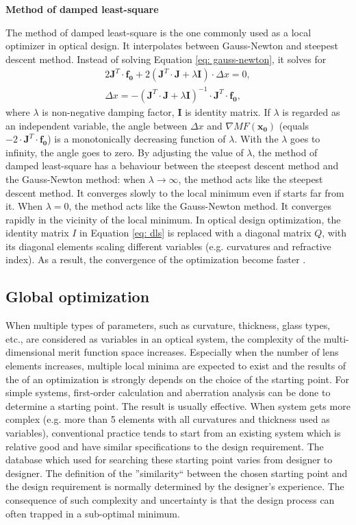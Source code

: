 \textbf{Method of damped least-square}

The method of damped least-square is the one commonly used as a local optimizer in optical design. It interpolates between Gauss-Newton and steepest descent method.  
Instead of solving Equation \ref{eq: gauss-newton}, it solves for 
\begin{equation} \label{eq: dls}
\begin{align}
2 \pmb{J}^{T} \cdot \pmb{f_0} + 2(\pmb{J}^T \cdot \pmb{J} + \lambda \pmb{I} )\cdot \Delta x = 0 , \\
\Delta x = - (\pmb{J}^T \cdot \pmb{J} + \lambda \pmb{I} )^{-1} \cdot \pmb{J}^{T} \cdot \pmb{f_0},
\end{align}
\end{equation}where $\lambda$ is non-negative damping factor, $\pmb{I}$ is identity matrix. If $\lambda$ is regarded as an independent variable, the angle between $\Delta x$ and $\nabla MF(\pmb{x_0}) $ (equals $-2 \cdot \pmb{J}^{T} \cdot \pmb{f_0}$) is a monotonically decreasing function of $\lambda$. With the $\lambda$ goes to infinity, the angle goes to zero. By adjusting the value of $\lambda$, the method of damped least-square has a behaviour between the steepest descent method and the Gauss-Newton method: when $\lambda \rightarrow \infty $, the method acts like the steepest descent method. It converges slowly to the local minimum even if starts far from it. When $\lambda = 0$, the method acts like the Gauss-Newton method. It converges rapidly in the vicinity of the local minimum. 
In optical design optimization, the identity matrix $I$ in Equation \ref{eq: dls} is replaced with a diagonal matrix $Q$, with its diagonal elements scaling different variables (e.g. curvatures and refractive index). As a result, the convergence of the optimization become faster \cite{Meiron:65_dls}.

\subsection{Global optimization}
\vspace{1em}
When multiple types of parameters, such as curvature, thickness, glass types, etc., are considered as variables in an optical system, the complexity of the multi-dimensional merit function space increases. Especially when the number of lens elements increases, multiple local minima are expected to exist and the results of the of an optimization is strongly depends on the choice of the starting point. For simple systems, first-order calculation and aberration analysis can be done to determine a starting point. The result is usually effective. When system gets more complex (e.g. more than 5 elements with all curvatures and thickness used as variables), conventional practice tends to start from an existing system which is relative good and have similar specifications to the design requirement. The database which used for searching these starting point varies from designer to designer. The definition of the ”similarity“ between the chosen starting point and the design requirement is normally determined by the designer's experience. The consequence of such complexity and uncertainty is that the design process can often trapped in a sub-optimal minimum. 


